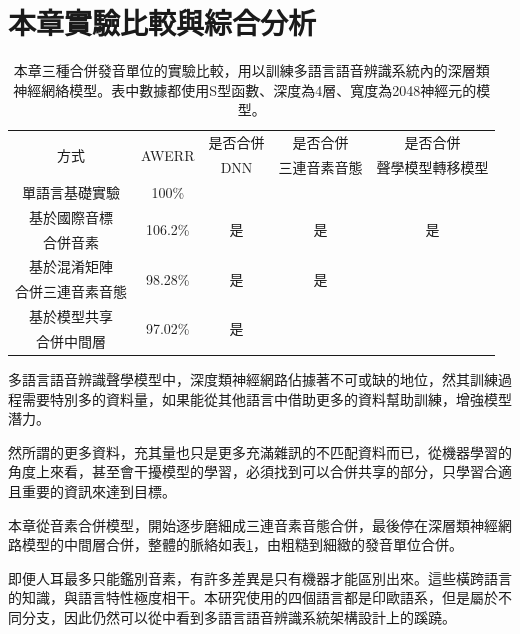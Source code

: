 \section{本章實驗比較與綜合分析}
\begin{table}[]
\centering
\begin{tabular}{|c|c|c|c|c|}
\hline
\multirow{2}{*}{方式} & \multirow{2}{*}{AWERR}    & 是否合併& 是否合併             & 是否合併 \\
     & & DNN  & 三連音素音態 &  聲學模型轉移模型 \\
\hline
單語言基礎實驗  & 100\% &  &  &   \\
\hline
基於國際音標 & \multirow{2}{*}{106.2\% } & \multirow{2}{*}{ 是 } & \multirow{2}{*}{是}  & \multirow{2}{*}{是}  \\
合併音素& & & & \\
\hline
基於混淆矩陣 & \multirow{2}{*}{ 98.28\%} & \multirow{2}{*}{ 是 } & \multirow{2}{*}{是}  &  \\
合併三連音素音態& & & & \\
\hline
基於模型共享 & \multirow{2}{*}{97.02\%} &\multirow{2}{*}{ 是 } &  &  \\
合併中間層 & & & & \\
\hline
\end{tabular}
\caption{本章三種合併發音單位的實驗比較，用以訓練多語言語音辨識系統內的深層類神經網絡模型。表中數據都使用S型函數、深度為4層、寬度為2048神經元的模型。}
\label{table:chap4_merging_illustrator}
\end{table}
多語言語音辨識聲學模型中，深度類神經網路佔據著不可或缺的地位，然其訓練過程需要特別多的資料量，如果能從其他語言中借助更多的資料幫助訓練，增強模型潛力。

然所謂的更多資料，充其量也只是更多充滿雜訊的不匹配資料而已，從機器學習的角度上來看，甚至會干擾模型的學習，必須找到可以合併共享的部分，只學習合適且重要的資訊來達到目標。

本章從音素合併模型，開始逐步磨細成三連音素音態合併，最後停在深層類神經網路模型的中間層合併，整體的脈絡如表\ref{table:chap4_merging_illustrator}，由粗糙到細緻的發音單位合併。

即便人耳最多只能鑑別音素，有許多差異是只有機器才能區別出來。這些橫跨語言的知識，與語言特性極度相干。本研究使用的四個語言都是印歐語系，但是屬於不同分支，因此仍然可以從中看到多語言語音辨識系統架構設計上的蹊蹺。
